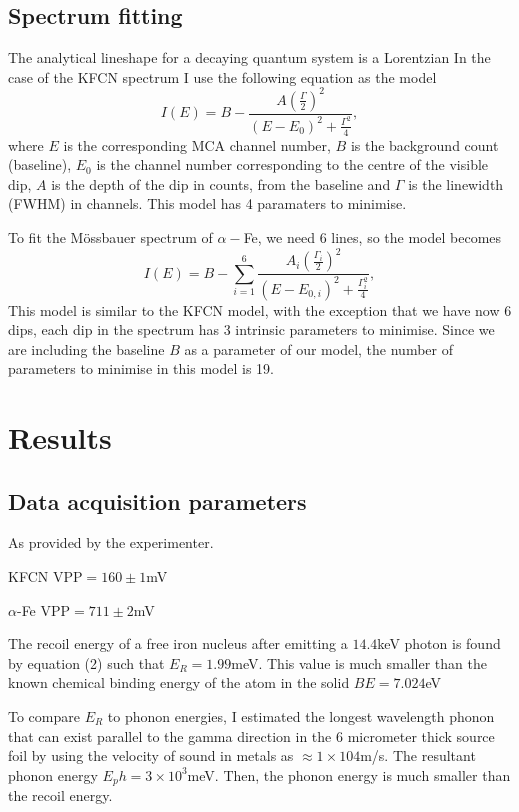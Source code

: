 \documentclass[a4paper, twocolumn]{article}
\newenvironment{itemizeReduced}{
\begin{list}{\labelitemi}{\leftmargin=1em}
\setlength{\itemsep}{1pt}
\setlength{\parskip}{0pt}
\setlength{\parsep}{0pt}}{\end{list}
}
\begin{document}
\subsection{Spectrum fitting}
The analytical lineshape for a decaying quantum system is a Lorentzian\cite{0}
In the case of the KFCN spectrum I use the following equation as the model
\begin{equation} I(E) = B - \frac{A(\frac{\Gamma}{2})^2}{(E - E_0)^2 + \frac{\Gamma^2}{4}},
\end{equation}
where $E$ is the corresponding MCA channel number, $B$ is the background count (baseline), $E_0$ is the channel number corresponding to the centre of the visible dip, $A$ is the depth of the dip in counts, from the baseline and $\Gamma$ is the linewidth (FWHM) in channels\cite{0}.
This model has 4 paramaters to minimise.

To fit the Mössbauer spectrum of $\alpha-$Fe, we need 6 lines, so the model becomes
\begin{equation} I(E) = B - \sum_{i=1}^{6}\frac{A_i(\frac{\Gamma_i}{2})^2}{(E - E_{0,i})^2 + \frac{\Gamma_{i}^2}{4}},
\end{equation}
This model is similar to the KFCN model, with the exception that we have now 6 dips, each dip in the spectrum has 3 intrinsic parameters to minimise. Since we are including the baseline $B$ as a parameter of our model, the number of parameters to minimise in this model is 19.

\clearpage
\onecolumn
\section{Results}
\subsection{Data acquisition parameters}
As provided by the experimenter.
\begin{itemizeReduced}
    \item KFCN VPP$=160\pm1$mV
    \item $\alpha$-Fe VPP$=711\pm2$mV
\end{itemizeReduced}

The recoil energy of a free iron nucleus after emitting a $14.4$keV photon is found by equation (2) such that $E_R = 1.99$meV. This value is much smaller than the known chemical binding energy of the atom in the solid $BE = 7.024$eV\cite{11}

To compare $E_R$ to phonon energies, I estimated the longest wavelength phonon that can exist parallel to the gamma direction in the 6 micrometer thick source foil by using the velocity of sound in metals as $\approx 1\times104$m/s\cite{0}. The resultant phonon energy $E_ph = 3\times10^3$meV. Then, the phonon energy is much smaller than the recoil energy.
\end{document}
